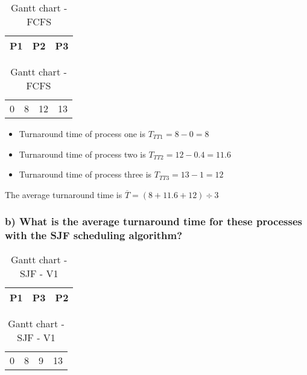 \documentclass[11pt]{article}
\begin{document}
\begin{table}[!htp]
    \centering            %
    \def\arraystretch{2}  %
    
    \begin{tabular}{|m{8cm}|m{4cm}|m{1cm}|}
        \hline
        P1 & P2 & P3 \\
        \hline
    \end{tabular}

    \begin{tabular}{m{8cm} m{4cm} m{1cm} l }
        0 & 8 & 12 & 13 \\
    \end{tabular}
    
    \caption{Gantt chart - FCFS}
\end{table}

\begin{itemize}
    \item Turnaround time of process one is $T_{TT1} = 8 - 0 = 8$
    \item Turnaround time of process two is $T_{TT2} = 12 - 0.4 = 11.6$
    \item Turnaround time of process three is $T_{TT3} = 13 - 1 = 12$
\end{itemize}

The average turnaround time is $\overline T = (8 + 11.6 + 12) \div 3 $

\newpage
\subsubsection*{b) What is the average turnaround time 
for these processes with the SJF scheduling algorithm?} 

\begin{table}[!htp]
    \centering            %
    \def\arraystretch{2}  %
    
    \begin{tabular}{|m{8cm}|m{1cm}|m{4cm}|}
        \hline
        P1 & P3 & P2 \\
        \hline
    \end{tabular}

    \begin{tabular}{m{8cm} m{1cm} m{4cm} l }
        0 & 8 & 9 & 13 \\
    \end{tabular}
    
    \caption{Gantt chart - SJF - V1}
\end{table}
\end{document}
